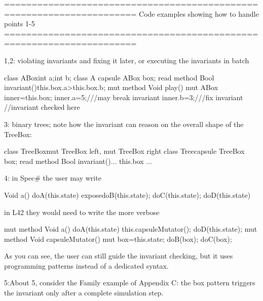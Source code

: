 ======================================================================
Code examples showing how to handle points 1-5
======================================================================

1,2: violating invariants and fixing it later, or executing the invariants in batch

class ABox{int a;int b;}
class A{
 capsule ABox box;
 read method Bool invariant(){this.box.a>this.box.b;}
 mut method Void play(){
   mut ABox inner=this.box;
   inner.a=5;///may break invariant
   inner.b=3;///fix invariant
   //invariant checked here
   }}

3: binary trees; note how the invariant can reason on the overall shape of the TreeBox:

class TreeBox{mut TreeBox left, mut TreeBox right}
class Tree{capsule TreeBox box; 
  read method Bool invariant(){... this.box ...}}

4: in Spec# the user may write

  Void a() {doA(this.state) expose{doB(this.state); doC(this.state);} doD(this.state)}

in L42 they would need to write the more verbose

  mut method Void a() {doA(this.state) this.capsuleMutator(); doD(this.state);}
  mut method Void capsuleMutator() {mut box=this.state; doB(box); doC(box);}

As you can see, the user can still guide the invariant checking, but it uses programming patterns
instead of a dedicated syntax.

5:About 5, consider the Family example of Appendix C: the box pattern triggers the
invariant only after a complete simulation step.